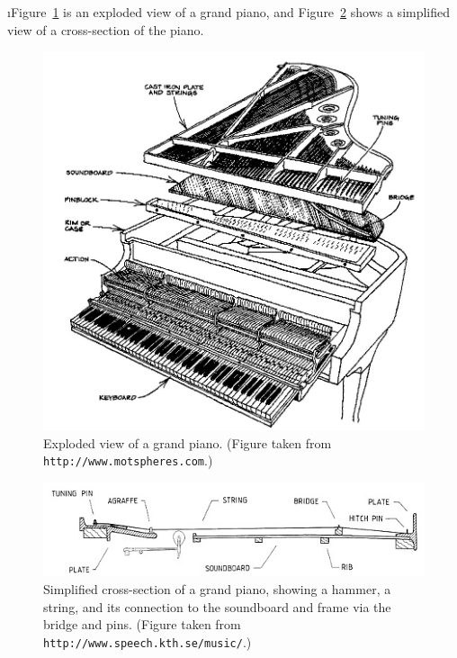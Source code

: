 \i Figure~\ref{f:grand-piano-exploded} is an 
exploded view of a grand piano, and 
Figure~\ref{f:piano-action1} shows a
simplified view of a cross-section of the piano.
%
\begin{figure}[htbp]
\begin{center}
\includegraphics[width=\textwidth]{grand-piano-exploded.jpg}
\caption{
Exploded view of a grand piano.
(Figure taken from 
{\tt http://www.motspheres.com}.)}
\label{f:grand-piano-exploded}
\end{center}
\end{figure}
%
\begin{figure}[htbp]
\begin{center}
\includegraphics[width=.9\textwidth]{piano-action1.jpg}
\caption{
Simplified cross-section of a grand piano, showing a hammer, 
a string, and its connection to the soundboard and frame via
the bridge and pins.
(Figure taken from 
{\tt http://www.speech.kth.se/music/}.)}
\label{f:piano-action1}
\end{center}
\end{figure}

